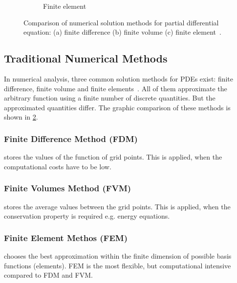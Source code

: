 \begin{figure}
\begin{subfigure}{.33\textwidth}
      \caption{Finite element}
      \label{fig:fem}
    \end{subfigure}
	\caption{Comparison of numerical solution methods for partial differential equation: (a) finite difference (b) finite volume (c) finite element~\cite{pdesolution}.}
	\label{fig:pdesolution}
\end{figure}  

\subsection{Traditional Numerical Methods}
In numerical analysis, three common solution methods for PDEs exist: finite difference, finite volume and finite elements~\cite{pdesolution}. All of them approximate the arbitrary function using a finite number of discrete quantities. But the approximated quantities differ. The graphic comparison of these methods is shown in \cref{fig:pdesolution}.

\subsubsection{Finite Difference Method (FDM)} stores the values of the function of grid points. This is applied, when the computational costs have to be low.
\subsubsection{Finite Volumes Method (FVM)} stores the average values between the grid points. This is applied, when the conservation property is required e.g. energy equations. 
\subsubsection{Finite Element Methos (FEM)} chooses the best approximation within the finite dimension of possible basis functions (elements). FEM is the most flexible, but computational intensive compared to FDM and FVM.


